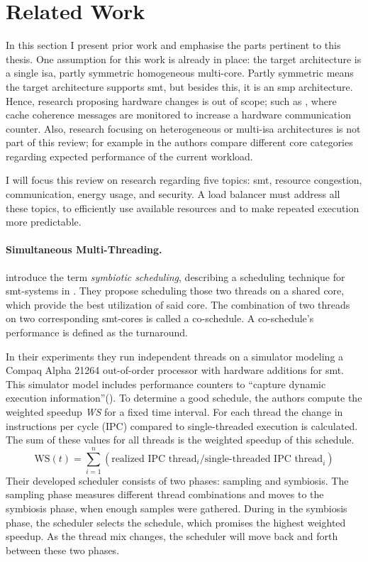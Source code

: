 \section{Related Work}
\label{state:related}

In this section I present prior work and emphasise the parts pertinent to
this thesis.
One assumption for this work is already in place:
the target architecture is a single \gls{isa}, partly symmetric homogeneous
multi-core.
Partly symmetric means the target architecture supports \gls{smt},
but besides this, it is an \gls{smp} architecture.
Hence, research proposing hardware changes is out of scope; such as
\cite{cruz_dynamic_2014}, where cache coherence messages are monitored to
increase a hardware communication counter.
Also, research focusing on heterogeneous or multi-\gls{isa} architectures is
not part of this review; for example in \cite{sarma_smartbalance_2015}
the authors compare different core categories regarding expected performance of
the current workload.

I will focus this review on research regarding five topics: \gls{smt},
resource congestion, communication, energy usage, and security.
A load balancer must address all these topics, to efficiently use available resources
and to make repeated execution more predictable.
\\

\paragraph{Simultaneous Multi-Threading.}
\citeauthor{snavely_symbiotic_2000} introduce the term \emph{symbiotic
scheduling}, describing a scheduling technique
for \gls{smt}-systems in \cite{snavely_symbiotic_2000}.
They propose scheduling those two threads on a shared core, which provide the best
utilization of said core.
The combination of two threads on two corresponding \gls{smt}-cores is called a
co-schedule.
A co-schedule's performance is defined as the turnaround.

In their experiments they run independent threads on a simulator modeling a Compaq
Alpha 21264 out-of-order processor with hardware additions for \gls{smt}.
This simulator model includes performance counters to ``capture dynamic execution
information''(\autocite[236]{snavely_symbiotic_2000}).
To determine a good schedule, the authors compute the weighted speedup \textit{WS} for
a fixed time interval.
For each thread the change in instructions per cycle (IPC) compared to
single-threaded execution is calculated.
The sum of these values for all threads is the weighted speedup of this
schedule.
$$ \text{WS}(t) = \sum_{i=1}^n (\text{realized IPC thread}_i / \text{single-threaded IPC
thread}_i)$$
Their developed scheduler consists of two phases: sampling and symbiosis.
The sampling phase measures different thread combinations and moves to the
symbiosis phase, when enough samples were gathered.
During in the symbiosis phase, the scheduler selects the schedule, which
promises the highest weighted speedup.
As the thread mix changes, the scheduler will move back and forth between these two
phases.

